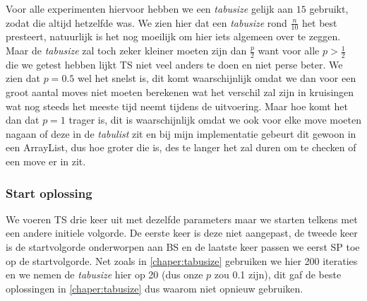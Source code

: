 \documentclass[kulak]{kulakarticle} %
\begin{document}
\noindent Voor alle experimenten hiervoor hebben we een \textit{tabusize} gelijk aan $15$ gebruikt, zodat die altijd hetzelfde was. We zien hier dat een \textit{tabusize} rond $\frac{n}{10}$ het best presteert, natuurlijk is het nog moeilijk om hier iets algemeen over te zeggen. Maar de \textit{tabusize} zal toch zeker kleiner moeten zijn dan $\frac{p}{2}$ want voor alle $p > \frac{1}{2}$ die we getest hebben lijkt TS niet veel anders te doen en niet perse beter. We zien dat $p=0.5$ wel het snelst is, dit komt waarschijnlijk omdat we dan voor een groot aantal moves niet moeten berekenen wat het verschil zal zijn in kruisingen wat nog steeds het meeste tijd neemt tijdens de uitvoering. Maar hoe komt het dan dat $p=1$ trager is, dit is waarschijnlijk omdat we ook voor elke move moeten nagaan of deze in de \textit{tabulist} zit en bij mijn implementatie gebeurt dit gewoon in een ArrayList, dus hoe groter die is, des te langer het zal duren om te checken of een move er in zit. 

\subsubsection{Start oplossing}

We voeren TS drie keer uit met dezelfde parameters maar we starten telkens met een andere initiele volgorde. De eerste keer is deze niet aangepast, de tweede keer is de startvolgorde onderworpen aan BS en de laatste keer passen we eerst SP toe op de startvolgorde. Net zoals in \ref{chaper:tabusize} gebruiken we hier 200 iteraties en we nemen de \textit{tabusize} hier op 20 (dus onze $p$ zou 0.1 zijn), dit gaf de beste oplossingen in \ref{chaper:tabusize} dus waarom niet opnieuw gebruiken. \\

\begin{table}[h]
    \centering
    \caption{We kijken naar het effect van de start oplossing voor de grafen uit \ref{chapter:eerste_experiment}.}
    \label{tab:start}
\end{table}
\end{document}
